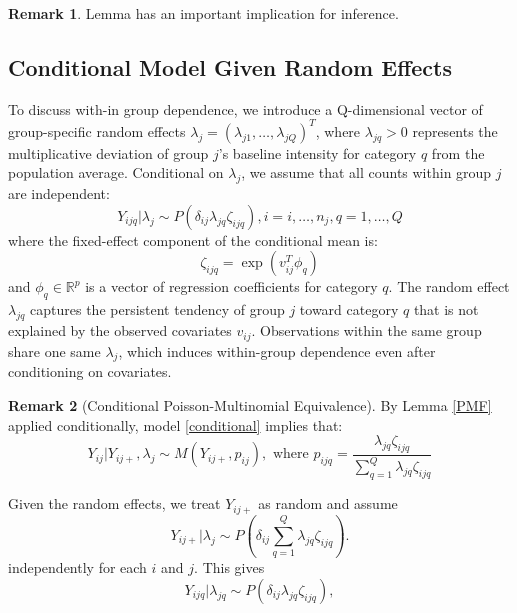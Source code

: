 \documentclass[]{article}
\theoremstyle{definition}
\newtheorem{remark}{Remark}
\begin{document}
	\begin{remark}
		Lemma has an important implication for inference. 
	\end{remark}
	
	\subsection{Conditional Model Given Random Effects}
	To discuss with-in group dependence, we introduce a Q-dimensional vector of group-specific random effects $\lambda_{j}=(\lambda_{j1},\dots ,\lambda_{jQ})^{T}$, where $\lambda_{jq}>0$ represents the multiplicative deviation of group $j$'s baseline intensity for category $q$ from the population average. Conditional on $\lambda_{j}$, we assume that all counts within group $j$ are independent:
	\begin{equation}\label{conditional}
		Y_{ijq}|\lambda_{j} \sim P(\delta_{ij}\lambda_{jq}\zeta_{ijq}), i=i,\dots ,n_{j}, q=1,\dots ,Q
	\end{equation}
where the fixed-effect component of the conditional mean is:
	\begin{equation}
		\zeta_{ijq}=\exp(v_{ij}^{T}\phi_{q})
	\end{equation}
and $\phi_{q}\in \mathbb{R}^{p}$ is a vector of regression coefficients for category $q$. The random effect $\lambda_{jq}$ captures the persistent tendency of group $j$ toward category $q$ that is not explained by the observed covariates $v_{ij}$. Observations within the same group share one same $\lambda_{j}$, which induces within-group dependence even after conditioning on covariates.
	\begin{remark}[Conditional Poisson-Multinomial Equivalence]
		By Lemma \ref{PMF} applied conditionally, model \ref{conditional} implies that:
		\begin{equation}
			Y_{ij}|Y_{ij+}, \lambda_{j}\sim M(Y_{ij+},p_{ij}), \text{ where } p_{ijq}=\dfrac{\lambda_{jq}\zeta_{ijq}}{\sum_{q=1}^{Q}\lambda_{jq}\zeta_{ijq}}
		\end{equation}
	\end{remark}
    Given the random effects, we treat $Y_{ij+}$ as random and assume 
		\begin{equation}
			Y_{ij+}|\lambda_{j}\sim P(\delta_{ij}\sum_{q=1}^{Q}\lambda_{jq}\zeta_{ijq}).
		\end{equation}
independently for each $i$ and $j$. This gives
\begin{equation}
Y_{ijq}|\lambda_{jq}\sim P(\delta_{ij}\lambda_{jq}\zeta_{ijq}),
\end{equation}
\end{document}

